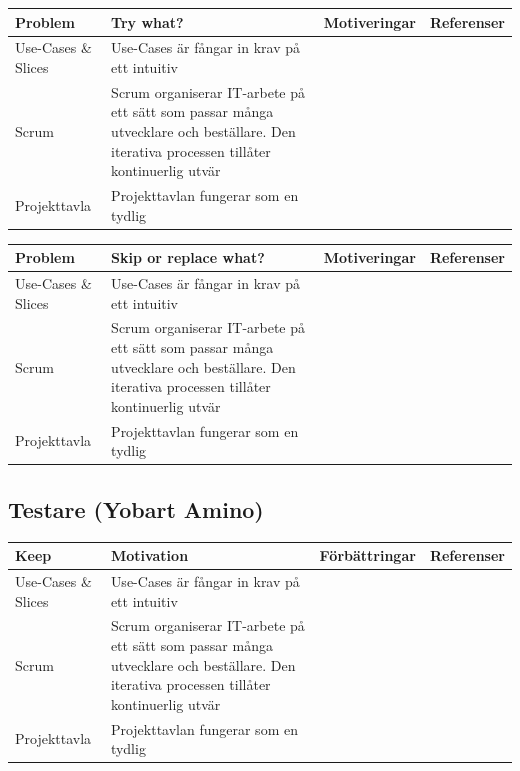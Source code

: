 \documentclass[conference,a4paper]{IEEEtran}
\newcommand\Tstrut{\rule{0pt}{2.6ex}}       %
\newcommand\Bstrut{\rule[-0.9ex]{0pt}{0pt}} %
\newcommand{\TBstrut}{\Tstrut\Bstrut} %
\begin{document}
\begin{table}[H]
	\small
  \centering
	\begin{tabular}{|p{1.5cm}|p{2cm}|p{1.8cm}|p{1.5cm}|} %
    \hline
    Problem & Try what? & Motiveringar & Referenser \TBstrut \\
    \hline
    Use-Cases \& Slices & Use-Cases är fångar in krav på ett intuitiv & & \TBstrut \\
    \hline
    Scrum & Scrum organiserar IT-arbete på ett sätt som passar många utvecklare och beställare. Den iterativa processen tillåter kontinuerlig utvär & & \TBstrut \\
    \hline
    Projekttavla & Projekttavlan fungerar som en tydlig & & \TBstrut \\
    \hline
  \end{tabular}
\end{table}

\begin{table}[H]
	\small
  \centering
	\begin{tabular}{|p{1.5cm}|p{2cm}|p{1.8cm}|p{1.5cm}|} %
    \hline
    Problem & Skip or replace what? & Motiveringar & Referenser \TBstrut \\
    \hline
    Use-Cases \& Slices & Use-Cases är fångar in krav på ett intuitiv & & \TBstrut \\
    \hline
    Scrum & Scrum organiserar IT-arbete på ett sätt som passar många utvecklare och beställare. Den iterativa processen tillåter kontinuerlig utvär & & \TBstrut \\
    \hline
    Projekttavla & Projekttavlan fungerar som en tydlig & & \TBstrut \\
    \hline
  \end{tabular}
\end{table}


\subsection{Testare (Yobart Amino)}
\begin{table}[H]
	\small
  \centering
	\begin{tabular}{|p{1.5cm}|p{2cm}|p{1.8cm}|p{1.5cm}|} %
    \hline
    Keep & Motivation & Förbättringar & Referenser \TBstrut \\
    \hline
    Use-Cases \& Slices & Use-Cases är fångar in krav på ett intuitiv & & \TBstrut \\
    \hline
    Scrum & Scrum organiserar IT-arbete på ett sätt som passar många utvecklare och beställare. Den iterativa processen tillåter kontinuerlig utvär & & \TBstrut \\
    \hline
    Projekttavla & Projekttavlan fungerar som en tydlig & & \TBstrut \\
    \hline
  \end{tabular}
\end{table}
\end{document}
